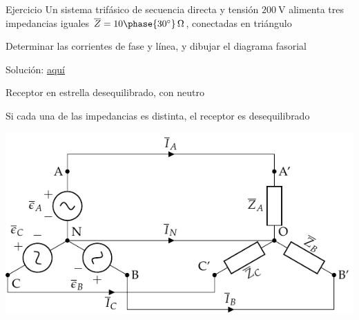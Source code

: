\documentclass[aspectratio=169, usenames,svgnames,dvipsnames]{beamer}
\begin{document}

\begin{frame}{Ejercicio}
    \vspace{19mm}
    Un sistema trifásico de secuencia directa y tensión $\qty{200}{\volt}$ alimenta tres impedancias iguales $\overline{Z}=10\phase{30^\circ}\,\Omega$, conectadas en triángulo

    \vspace{5mm}
    Determinar las corrientes de fase y línea, y dibujar el diagrama fasorial

    \vspace{28mm}
    \alert{Solución}: \href{https://raw.githubusercontent.com/ETSIDI-IE/tc/master/docs/ejercicios_clase/TC1_03_Ejemplo_3_3_libro_LBB.pdf}{aquí}
\end{frame}


\begin{frame}{Receptor en estrella desequilibrado, \hspace{3mm}con neutro}

    \vspace{2mm}
    Si cada una de las impedancias es distinta, el receptor es \alert{desequilibrado}

    \vspace{-2mm}
    \begin{center}
        \includegraphics[width=.9\linewidth]{../figs/EstrellaDesequilibrado.pdf}
    \end{center}
\end{frame}

\end{document}
